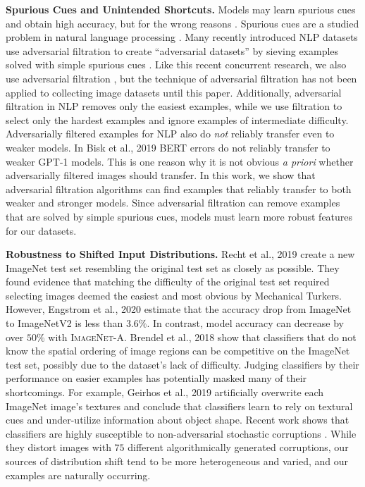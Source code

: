 \documentclass[10pt,twocolumn,letterpaper]{article}
\begin{document}
\noindent\textbf{Spurious Cues and Unintended Shortcuts.} Models may learn spurious cues and obtain high accuracy, but for the wrong reasons \cite{Lapuschkin2019UnmaskingCH,Geirhos2020ShortcutLI}. Spurious cues are a studied problem in natural language processing \cite{Cai2017PayAT,Gururangan2018AnnotationAI}. Many recently introduced NLP datasets use adversarial filtration to create ``adversarial datasets'' by sieving examples solved with simple spurious cues \cite{Sakaguchi2019WINOGRANDEAA,Bhagavatula2019AbductiveCR,Zellers2019HellaSwagCA,Dua2019DROPAR,Bisk2020PIQARA,Hendrycks2020AligningAW}. Like this recent concurrent research, we also use adversarial filtration \cite{Sung1995LearningAE}, but the technique of adversarial filtration has not been applied to collecting image datasets until this paper. Additionally, adversarial filtration in NLP removes only the easiest examples, while we use filtration to select only the hardest examples and ignore examples of intermediate difficulty.
Adversarially filtered examples for NLP also do \emph{not} reliably transfer even to weaker models. In Bisk et al., 2019 \cite{Bisk2019PIQARA} BERT errors do not reliably transfer to weaker GPT-1 models. This is one reason why it is not obvious \emph{a priori} whether adversarially filtered images should transfer. In this work, we show that adversarial filtration algorithms can find examples that reliably transfer to both weaker and stronger models. Since adversarial filtration can remove examples that are solved by simple spurious cues, models must learn more robust features for our datasets. 

\noindent\textbf{Robustness to Shifted Input Distributions.}\quad 
Recht et al., 2019 \cite{Recht2019DoIC} create a new ImageNet test set resembling the original test set as closely as possible. 
They found evidence that matching the difficulty of the original test set required selecting images deemed the easiest and most obvious by Mechanical Turkers. However, Engstrom et al., 2020 \cite{Engstrom2020IdentifyingSB} estimate that the accuracy drop from ImageNet to ImageNetV2 is less than $3.6\%$.
In contrast, model accuracy can decrease by over $50\%$ with \textsc{ImageNet-A}. Brendel et al., 2018 \cite{Brendel2018ApproximatingCW} show that classifiers that do not know the spatial ordering of image regions can be competitive on the ImageNet test set, possibly due to the dataset's lack of difficulty. Judging classifiers by their performance on easier examples has potentially masked many of their shortcomings. For example, Geirhos et al., 2019 \cite{geirhos2019} artificially overwrite each ImageNet image's textures and conclude that classifiers learn to rely on textural cues and under-utilize information about object shape. Recent work shows that classifiers are highly susceptible to non-adversarial stochastic corruptions \cite{hendrycks2019robustness}. While they distort images with $75$ different algorithmically generated corruptions, our sources of distribution shift tend to be more heterogeneous and varied, and our examples are naturally occurring.
\end{document}
